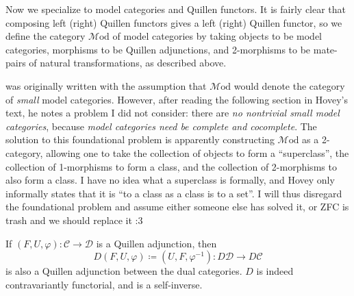 \begin{construction}
	Now we specialize to model categories and Quillen functors. It is fairly clear that composing left (right) Quillen functors gives a left (right) Quillen functor, so we define the category $\mathcal{M} \mathrm{od} $ of model categories by taking objects to be model categories, morphisms to be Quillen adjunctions, and 2-morphisms to be mate-pairs of natural transformations, as described above.
\end{construction}

\begin{remark}\label{3.1.11}
	 was originally written with the assumption that $\mathcal{M} \mathrm{od} $ would denote the category of \emph{small} model categories. However, after reading the following section in Hovey's text, he notes a problem I did not consider: there are \emph{no nontrivial small model categories}, because \emph{model categories need be complete and cocomplete}. The solution to this foundational problem is apparently constructing $\mathcal{M} \mathrm{od} $ as a 2-category, allowing one to take the collection of objects to form a ``superclass'', the collection of 1-morphisms to form a class, and the collection of 2-morphisms to also form a class. I have no idea what a superclass is formally, and Hovey only informally states that it is ``to a class as a class is to a set''. I will thus disregard the foundational problem and assume either someone else has solved it, or ZFC is trash and we should replace it :3
\end{remark}

\begin{remark}\label{3.1.12}
	If $(F,U,\varphi): \mathcal{C}  \to \mathcal{D} $ is a Quillen adjunction, then
	\[
		D(F,U,\varphi)\coloneqq (U,F,\varphi ^{-1} ): D\mathcal{D}  \to D\mathcal{C} 
	\]
	is also a Quillen adjunction between the dual categories. $D$ is indeed contravariantly functorial, and is a self-inverse.
\end{remark}

